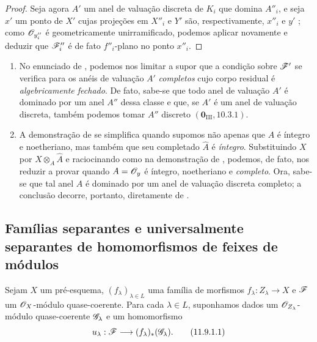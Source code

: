 \begin{proof}
Seja agora $A'$ um anel
de valuação discreta de
$K_i$ que domina $A''_i$,
e seja $x'$ um ponto de
$X'$ cujas projeções em
$X''_i$ e $Y'$ são,
respectivamente, $x''_i$
e $y'$ ;
como $\mathscr{O}_{y''_i}$ é
geometricamente
unirramificado, podemos
aplicar novamente
 e deduzir
que $\mathscr{F}''_i$ é de fato
$f''_i$-plano no ponto
$x''_i$.
\end{proof}

\begin{remarks}[11.8.2]
\label{IV.11.8.2}
\begin{enumerate}[label=(\roman*)]
  \item No enunciado de
  , podemos
  nos limitar a supor que
  a condição sobre $\mathscr{F}'$
  se verifica para os anéis
  de valuação $A'$
  \emph{completos} cujo corpo
  residual é
  \emph{algebricamente
  fechado}. De fato, sabe-se
  que todo anel de valuação
  $A'$ é dominado por um
  anel $A''$ dessa classe
   e
  que, se $A'$ é um anel
  de valuação discreta,
  também podemos tomar
  $A''$ discreto
  $(\mathbf 0_{\mathrm{III}},
  10.3.1)$.

  \item A demonstração de
   se
  simplifica quando supomos
  não apenas que $A$ é
  íntegro e noetheriano,
  mas também que seu
  completado $\widehat A$
  é \emph{íntegro}.
  Substituindo $X$ por
  $X\otimes_A\widehat A$
  e raciocinando como na
  demonstração de
  ,
  podemos, de fato,
  nos reduzir a provar
   quando
  $A=\mathscr{O}_y$ é íntegro,
  noetheriano e
  \emph{completo}. Ora,
  sabe-se 
  que tal anel $A$ é
  dominado por um anel
  de valuação discreta
  completo; a conclusão
  decorre, portanto,
  diretamente de
  .
\end{enumerate}
\end{remarks}

\subsection{Famílias separantes e universalmente separantes de homomorfismos de feixes de módulos}
\label{subsection:IV.11.9}

\begin{env}[11.9.1]
\label{IV.11.9.1}
Sejam $X$ um pré-esquema,
$(f_\lambda)_{\lambda\in L}$
uma família de morfismos
$f_\lambda:Z_\lambda\to X$
e $\mathscr{F}$ um
$\mathscr{O}_X$-módulo
quase-coerente. Para cada
$\lambda\in L$, suponhamos
dados um
$\mathscr{O}_{Z_\lambda}$-módulo
quase-coerente
$\mathscr{G}_\lambda$ e um
homomorfismo
\begin{equation}
u_\lambda:\sh{F}
\longrightarrow
(f_\lambda)_*(\sh{G}_\lambda).
\label{IV.11.9.1.1}
\tag{11.9.1.1}
\end{equation}
\end{env}

